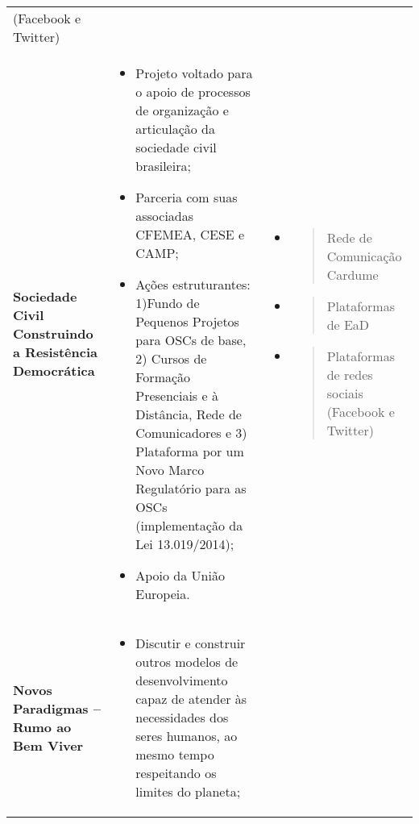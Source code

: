 \begin{longtable}[]{@{}lll@{}}
\begin{minipage}[t]{0.32\columnwidth}
(Facebook e Twitter)\strut
\end{minipage}\tabularnewline
\begin{minipage}[t]{0.32\columnwidth}\raggedright\strut
\textbf{Sociedade Civil Construindo a Resistência Democrática}\strut
\end{minipage} & \begin{minipage}[t]{0.32\columnwidth}\raggedright\strut
\begin{itemize}
\item
  Projeto voltado para o apoio de processos de organização e articulação
  da sociedade civil brasileira;
\item
  Parceria com suas associadas CFEMEA, CESE e CAMP;
\item
  Ações estruturantes: 1)Fundo de Pequenos Projetos para OSCs de base,
  2) Cursos de Formação Presenciais e à Distância, Rede de Comunicadores
  e 3) Plataforma por um Novo Marco Regulatório para as OSCs
  (implementação da Lei 13.019/2014);
\item
  Apoio da União Europeia.
\end{itemize}\strut
\end{minipage} & \begin{minipage}[t]{0.32\columnwidth}\raggedright\strut
\begin{itemize}
\item
  \begin{quote}
  Rede de Comunicação Cardume
  \end{quote}
\item
  \begin{quote}
  Plataformas de EaD
  \end{quote}
\item
  \begin{quote}
  Plataformas de redes sociais (Facebook e Twitter)
  \end{quote}
\end{itemize}\strut
\end{minipage}\tabularnewline
\begin{minipage}[t]{0.32\columnwidth}\raggedright\strut
\textbf{Novos Paradigmas -- Rumo ao Bem Viver}\strut
\end{minipage} & \begin{minipage}[t]{0.32\columnwidth}\raggedright\strut
\begin{itemize}
\item
  Discutir e construir outros modelos de desenvolvimento capaz de
  atender às necessidades dos seres humanos, ao mesmo tempo respeitando
  os limites do planeta;

\end{itemize}
\end{minipage}
\end{longtable}
